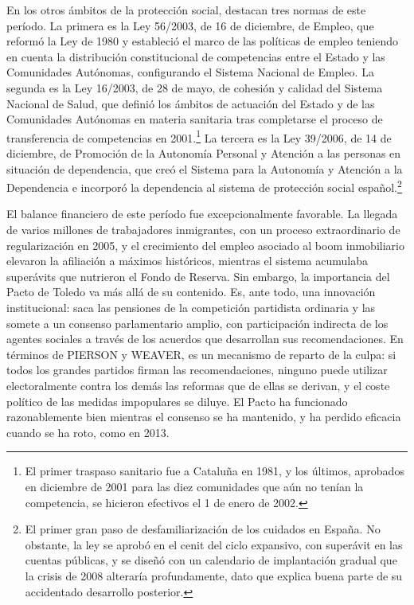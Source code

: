\documentclass[10pt,a4paper]{article}
\begin{document}
En los otros ámbitos de la protección social, destacan tres normas de este período. La primera es la Ley 56/2003, de 16 de diciembre, de Empleo, que reformó la Ley de 1980 y estableció el marco de las políticas de empleo teniendo en cuenta la distribución constitucional de competencias entre el Estado y las Comunidades Autónomas, configurando el Sistema Nacional de Empleo. La segunda es la Ley 16/2003, de 28 de mayo, de cohesión y calidad del Sistema Nacional de Salud, que definió los ámbitos de actuación del Estado y de las Comunidades Autónomas en materia sanitaria tras completarse el proceso de transferencia de competencias en 2001.\footnote{El primer traspaso sanitario fue a Cataluña en 1981, y los últimos, aprobados en diciembre de 2001 para las diez comunidades que aún no tenían la competencia, se hicieron efectivos el 1 de enero de 2002.
} La tercera es la Ley 39/2006, de 14 de diciembre, de Promoción de la Autonomía Personal y Atención a las personas en situación de dependencia, que creó el Sistema para la Autonomía y Atención a la Dependencia e incorporó la dependencia al sistema de protección social español.\footnote{El primer gran paso de desfamiliarización de los cuidados en España. No obstante, la ley se aprobó en el cenit del ciclo expansivo, con superávit en las cuentas públicas, y se diseñó con un calendario de implantación gradual que la crisis de 2008 alteraría profundamente, dato que explica buena parte de su accidentado desarrollo posterior.
}

El balance financiero de este período fue excepcionalmente favorable. La llegada de varios millones de trabajadores inmigrantes, con un proceso extraordinario de regularización en 2005, y el crecimiento del empleo asociado al boom inmobiliario elevaron la afiliación a máximos históricos, mientras el sistema acumulaba superávits que nutrieron el Fondo de Reserva. Sin embargo, la importancia del Pacto de Toledo va más allá de su contenido. Es, ante todo, una innovación institucional: saca las pensiones de la competición partidista ordinaria y las somete a un consenso parlamentario amplio, con participación indirecta de los agentes sociales a través de los acuerdos que desarrollan sus recomendaciones. En términos de PIERSON y WEAVER, es un mecanismo de reparto de la culpa: si todos los grandes partidos firman las recomendaciones, ninguno puede utilizar electoralmente contra los demás las reformas que de ellas se derivan, y el coste político de las medidas impopulares se diluye. El Pacto ha funcionado razonablemente bien mientras el consenso se ha mantenido, y ha perdido eficacia cuando se ha roto, como en 2013. 
\end{document}
